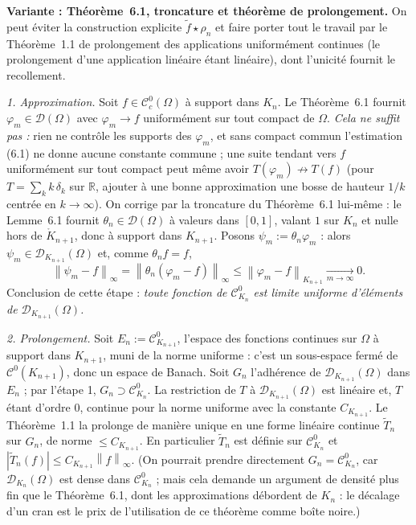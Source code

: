 \documentclass[11pt,a4paper]{article}
\newcommand{\R}{\mathbb{R}}
\newcommand{\interieur}[1]{\mathring{#1}}
\newcommand{\norm}[1]{\left\|#1\right\|}
\newcommand{\Cz}{\mathcal{C}^0}
\newcommand{\Cc}{\mathcal{C}^0_c}
\newcommand{\D}{\mathcal{D}}
\theoremstyle{definition}
\begin{document}
\begin{methode}
\textbf{Variante : Théorème~6.1, troncature et théorème de prolongement.} On peut éviter la construction explicite $\tilde f\star\rho_n$ et faire porter tout le travail par le Théorème~1.1 de prolongement des applications uniformément continues (le prolongement d'une application linéaire étant linéaire), dont l'unicité fournit le recollement.

\emph{1. Approximation.} Soit $f\in\Cc(\Omega)$ à support dans $K_n$. Le Théorème~6.1 fournit $\varphi_m\in\D(\Omega)$ avec $\varphi_m\to f$ uniformément sur tout compact de $\Omega$. \emph{Cela ne suffit pas :} rien ne contrôle les supports des $\varphi_m$, et sans compact commun l'estimation (6.1) ne donne aucune constante commune ; une suite tendant vers $f$ uniformément sur tout compact peut même avoir $T(\varphi_m)\not\to T(f)$ (pour $T=\sum_kk\,\delta_k$ sur $\R$, ajouter à une bonne approximation une bosse de hauteur $1/k$ centrée en $k\to\infty$). On corrige par la troncature du Théorème~6.1 lui-même : le Lemme~6.1 fournit $\theta_n\in\D(\Omega)$ à valeurs dans $[0,1]$, valant $1$ sur $K_n$ et nulle hors de $\interieur K_{n+1}$, donc à support dans $K_{n+1}$. Posons $\psi_m:=\theta_n\varphi_m$ : alors $\psi_m\in\D_{K_{n+1}}(\Omega)$ et, comme $\theta_nf=f$,
\[
\norm{\psi_m-f}_\infty=\norm{\theta_n(\varphi_m-f)}_\infty\le\norm{\varphi_m-f}_{K_{n+1}}\xrightarrow[m\to\infty]{}0 .
\]
Conclusion de cette étape : \emph{toute fonction de $\mathcal C^0_{K_n}$ est limite uniforme d'éléments de $\D_{K_{n+1}}(\Omega)$.}

\emph{2. Prolongement.} Soit $E_n:=\mathcal C^0_{K_{n+1}}$, l'espace des fonctions continues sur $\Omega$ à support dans $K_{n+1}$, muni de la norme uniforme : c'est un sous-espace fermé de $\Cz(K_{n+1})$, donc un espace de Banach. Soit $G_n$ l'adhérence de $\D_{K_{n+1}}(\Omega)$ dans $E_n$ ; par l'étape 1, $G_n\supset\mathcal C^0_{K_n}$. La restriction de $T$ à $\D_{K_{n+1}}(\Omega)$ est linéaire et, $T$ étant d'ordre $0$, continue pour la norme uniforme avec la constante $C_{K_{n+1}}$. Le Théorème~1.1 la prolonge de manière unique en une forme linéaire continue $\tilde T_n$ sur $G_n$, de norme $\le C_{K_{n+1}}$. En particulier $\tilde T_n$ est définie sur $\mathcal C^0_{K_n}$ et $|\tilde T_n(f)|\le C_{K_{n+1}}\norm f_\infty$. (On pourrait prendre directement $G_n=\mathcal C^0_{K_n}$, car $\D_{K_n}(\Omega)$ est dense dans $\mathcal C^0_{K_n}$ ; mais cela demande un argument de densité plus fin que le Théorème~6.1, dont les approximations débordent de $K_n$ : le décalage d'un cran est le prix de l'utilisation de ce théorème comme boîte noire.)


\end{methode}
\end{document}
